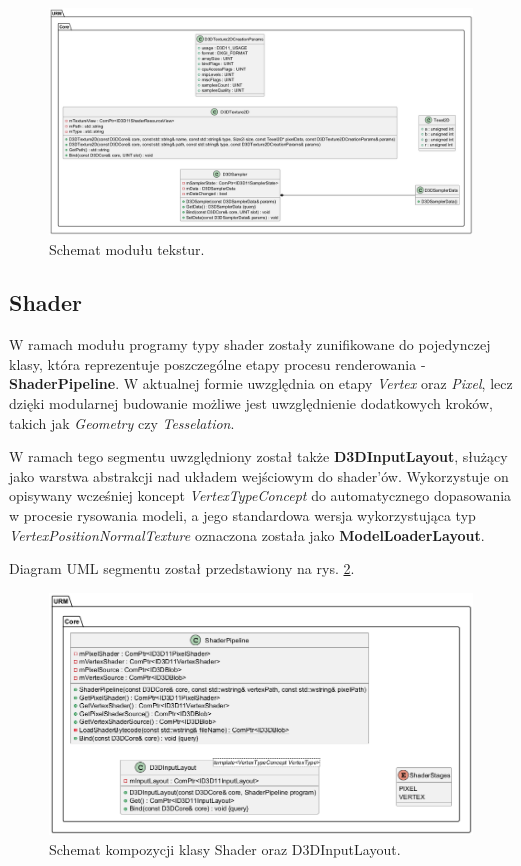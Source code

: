 	\begin{figure}[h!]
		\centering
		\includegraphics[width=\textwidth]{images/UML/texture.png}
		\caption{Schemat modułu tekstur.}
		\label{UML_Textures}
	\end{figure}
	
\subsection{Shader}
	W ramach modułu programy typy shader zostały zunifikowane do pojedynczej klasy, która reprezentuje poszczególne etapy procesu renderowania - \textbf{ShaderPipeline}. W aktualnej formie uwzględnia on etapy \textit{Vertex} oraz \textit{Pixel}, lecz dzięki modularnej budowanie możliwe jest uwzględnienie dodatkowych kroków, takich jak \textit{Geometry} czy \textit{Tesselation}.
	
	W ramach tego segmentu uwzględniony został także \textbf{D3DInputLayout}, służący jako warstwa abstrakcji nad układem wejściowym do shader'ów. Wykorzystuje on opisywany wcześniej koncept \textit{VertexTypeConcept} do automatycznego dopasowania w procesie rysowania modeli, a jego standardowa wersja wykorzystująca typ \textit{VertexPositionNormalTexture} oznaczona została jako \textbf{ModelLoaderLayout}.
	
	Diagram UML segmentu został przedstawiony na rys. \ref{UML_ShaderPipeline}.
	
	\begin{figure}[h!]
		\centering
		\includegraphics[width=\textwidth]{images/UML/shader.png}
		\caption{Schemat kompozycji klasy Shader oraz D3DInputLayout.}
		\label{UML_ShaderPipeline}
	\end{figure}
	
